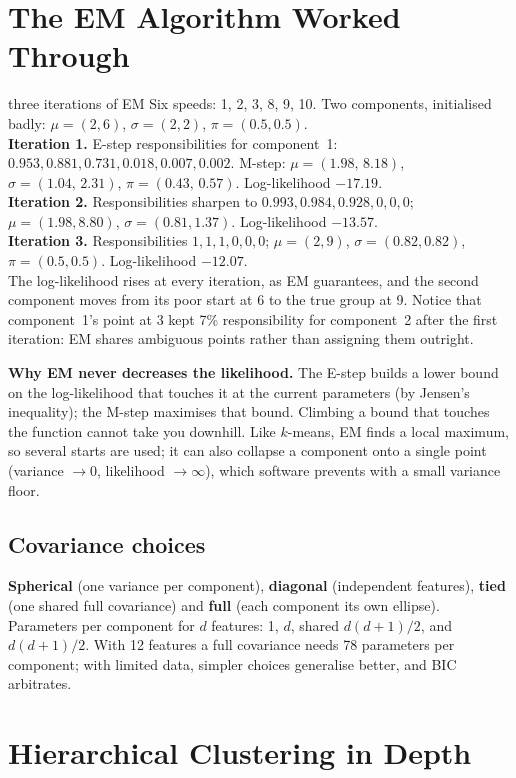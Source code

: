 \documentclass[11pt]{article}
\begin{document}
\section{The EM Algorithm Worked Through}
\begin{example}{three iterations of EM}
Six speeds: 1, 2, 3, 8, 9, 10. Two components, initialised badly: $\mu=(2,6)$, $\sigma=(2,2)$, $\pi=(0.5,0.5)$.\\[2pt]
\textbf{Iteration 1.} E-step responsibilities for component~1: $0.953,0.881,0.731,0.018,0.007,0.002$. M-step: $\mu=(1.98,\,8.18)$, $\sigma=(1.04,\,2.31)$, $\pi=(0.43,\,0.57)$. Log-likelihood $-17.19$.\\
\textbf{Iteration 2.} Responsibilities sharpen to $0.993,0.984,0.928,0,0,0$; $\mu=(1.98,8.80)$, $\sigma=(0.81,1.37)$. Log-likelihood $-13.57$.\\
\textbf{Iteration 3.} Responsibilities $1,1,1,0,0,0$; $\mu=(2,9)$, $\sigma=(0.82,0.82)$, $\pi=(0.5,0.5)$. Log-likelihood $-12.07$.\\[2pt]
The log-likelihood rises at every iteration, as EM guarantees, and the second component moves from its poor start at 6 to the true group at 9. Notice that component~1's point at 3 kept 7\% responsibility for component~2 after the first iteration: EM shares ambiguous points rather than assigning them outright.
\end{example}
\textbf{Why EM never decreases the likelihood.} The E-step builds a lower bound on the log-likelihood that touches it at the current parameters (by Jensen's inequality); the M-step maximises that bound. Climbing a bound that touches the function cannot take you downhill. Like $k$-means, EM finds a local maximum, so several starts are used; it can also collapse a component onto a single point (variance $\to0$, likelihood $\to\infty$), which software prevents with a small variance floor.
\subsection{Covariance choices}
\textbf{Spherical} (one variance per component), \textbf{diagonal} (independent features), \textbf{tied} (one shared full covariance) and \textbf{full} (each component its own ellipse). Parameters per component for $d$ features: 1, $d$, shared $d(d+1)/2$, and $d(d+1)/2$. With 12 features a full covariance needs 78 parameters per component; with limited data, simpler choices generalise better, and BIC arbitrates.

\section{Hierarchical Clustering in Depth}
\end{document}
